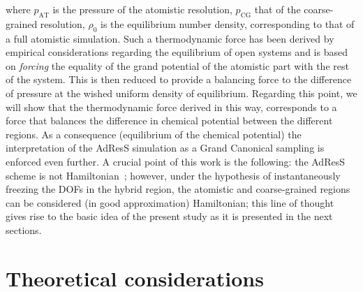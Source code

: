 \documentclass[aip,jcp,a4paper,reprint,onecolumn]{revtex4-1}
\newcommand{\AT}{{\textrm{{AT}}}}
\newcommand{\CG}{{\textrm{CG}}}
\begin{document}
where $p_{\AT}$ is the pressure of the atomistic resolution, $p_{\CG}$ that of the coarse-grained resolution, $\rho_{0}$ is the equilibrium number density, corresponding to that of a full atomistic simulation.
Such a thermodynamic force has been derived by empirical considerations regarding the equilibrium of open systems and is based on {\it forcing} the equality of the grand potential of the atomistic part with the rest of the system.
This is then reduced to provide a balancing force to the difference of pressure at the wished uniform density of equilibrium. Regarding this point, we will show that the thermodynamic force derived in this way, corresponds to a force that balances the difference in chemical potential between the different regions. As a consequence (equilibrium of the chemical potential) the interpretation of the AdResS simulation as a Grand Canonical sampling is enforced even further.
 A crucial point of this work is the following: the 
AdResS scheme is not Hamiltonian~\cite{presolo,prlcomm}; however, under the hypothesis of instantaneously
freezing the DOFs in the hybrid region, the atomistic and
coarse-grained regions can be considered (in good approximation) Hamiltonian; this line of thought gives rise to the basic
idea of the present study as it is presented in the next sections.

\section{Theoretical considerations}
\end{document}

